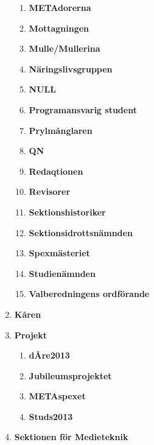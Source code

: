 \documentclass[a4paper]{article}
\begin{document}
\begin{enumerate}
\begin{enumerate}
    \item \textbf{METAdorerna}

    \item \textbf{Mottagningen}

    \item \textbf{Mulle/Mullerina}

    \item \textbf{Näringslivsgruppen}

    \item \textbf{NULL}

    \item \textbf{Programansvarig student}

    \item \textbf{Prylmånglaren}

    \item \textbf{QN}

    \item \textbf{Redaqtionen} 

    \item \textbf{Revisorer}

    \item \textbf{Sektionshistoriker}

    \item \textbf{Sektionsidrottsnämnden}

    \item \textbf{Spexmästeriet}

    \item \textbf{Studienämnden}

    \item \textbf{Valberedningens ordförande} 

  \end{enumerate}

\item \textbf{Kåren}

\item \textbf{Projekt}

  \begin{enumerate}

    \item \textbf{dÅre2013}

    \item \textbf{Jubileumsprojektet}

    \item \textbf{METAspexet}

    \item \textbf{Studs2013}

  \end{enumerate}

\item \textbf{Sektionen för Medieteknik}

\end{enumerate}
\end{document}
